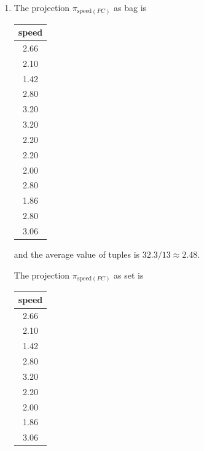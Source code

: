 \documentclass[12pt]{article}
\begin{document}
\begin{enumerate}
    \item

    The projection $\pi_{\text{speed}(PC)}$ as bag is

    \bigskip

    \begin{tabular}{|c|}
        \hline
        speed\\
        \hline
        2.66\\
        \hline
        2.10\\
        \hline
        1.42\\
        \hline
        2.80\\
        \hline
        3.20\\
        \hline
        3.20\\
        \hline
        2.20\\
        \hline
        2.20\\
        \hline
        2.00\\
        \hline
        2.80\\
        \hline
        1.86\\
        \hline
        2.80\\
        \hline
        3.06\\
        \hline
    \end{tabular}

    \bigskip

    and the average value of tuples is $32.3/13 \approx 2.48$.

    \bigskip

    The projection $\pi_{\text{speed}(PC)}$ as set is

    \bigskip

    \begin{tabular}{|c|}
        \hline
        speed\\
        \hline
        2.66\\
        \hline
        2.10\\
        \hline
        1.42\\
        \hline
        2.80\\
        \hline
        3.20\\
        \hline
        2.20\\
        \hline
        2.00\\
        \hline
        1.86\\
        \hline
        3.06\\
        \hline
    \end{tabular}


\end{enumerate}
\end{document}
